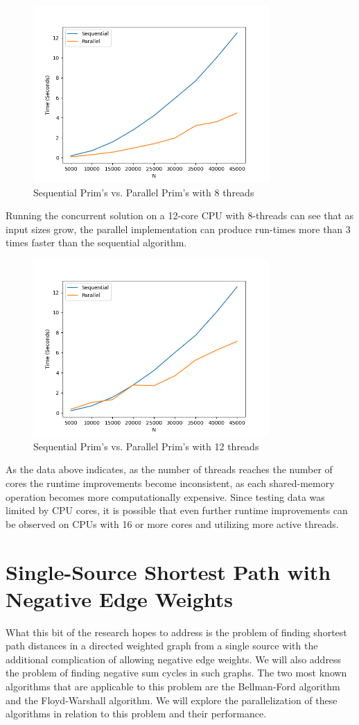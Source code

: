 \documentclass[conference]{IEEEtran}
\begin{document}
\begin{figure}[h]
    \includegraphics[width=9cm]{images/benchprim8.png}
    \caption{Sequential Prim's vs. Parallel Prim's with 8 threads}
    \label{fig:prim_8_comparison}
\end{figure}
Running the concurrent solution on a 12-core CPU with 8-threads can see that as input sizes grow, the parallel implementation can produce run-times more than 3 times faster than the sequential algorithm.
\begin{figure}[h]
    \includegraphics[width=9cm]{images/benchprim12.png}
    \caption{Sequential Prim's vs. Parallel Prim's with 12 threads}
    \label{fig:prim_12_comparison}
\end{figure}
As the data above indicates, as the number of threads reaches the number of cores the runtime improvements become inconsistent, as each shared-memory operation becomes more computationally expensive. Since testing data was limited by CPU cores, it is possible that even further runtime improvements can be observed on CPUs with 16 or more cores and utilizing more active threads.

\section{Single-Source Shortest Path with Negative Edge Weights}
What this bit of the research hopes to address is the problem of finding shortest path distances in a directed weighted graph from a single source with the additional complication of allowing negative edge weights. We will also address the problem of finding negative sum cycles in such graphs. The two most known algorithms that are applicable to this problem are the Bellman-Ford algorithm and the Floyd-Warshall algorithm. We will explore the parallelization of these algorithms in relation to this problem and their performance.
\end{document}
